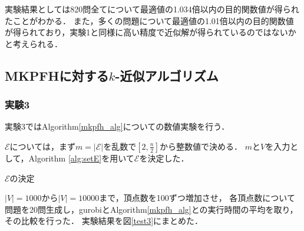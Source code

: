 \documentclass[11pt,dvipdfmx]{jarticle}
\numberwithin{equation}{section}
\begin{document}
            実験結果としては820問全てについて最適値の1.034倍以内の目的関数値が得られたことがわかる．
            また，多くの問題について最適値の1.01倍以内の目的関数値が得られており，実験1と同様に高い精度で近似解が得られているのではないかと考えられる．
    \subsection{MKPFHに対する$k$-近似アルゴリズム}
        \subsubsection{実験3}
            実験3ではAlgorithm\ref{mkpfh_alg}についての数値実験を行う．\par
            $\mathcal{E}$については，まず$m=|\mathcal{E}|$を乱数で$[2,\frac{n}{2}]$から整数値で決める．
            $m$と$V$を入力として，Algorithm \ref{alg:setE}を用いて$\mathcal{E}$を決定した．\par
            \begin{algorithm}
                \caption{$\mathcal{E}$の決定}
                \label{alg:setE}
                \begin{algorithmic}[1]
                            \EndIf
                        \EndFor
                    \EndWhile
                \end{algorithmic}
            \end{algorithm}
            $|V|=1000$から$|V|=10000$まで，頂点数を100ずつ増加させ，
            各頂点数について問題を20問生成し，gurobiとAlgorithm\ref{mkpfh_alg}との実行時間の平均を取り，その比較を行った．
            実験結果を図\ref{test3}にまとめた．\par
\end{document}
